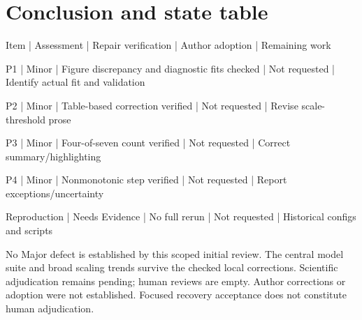 \documentclass[10pt]{article}
\begin{document}
\section*{Conclusion and state table}
Item | Assessment | Repair verification | Author adoption | Remaining work\par
P1 | Minor | Figure discrepancy and diagnostic fits checked | Not requested | Identify actual fit and validation\par
P2 | Minor | Table-based correction verified | Not requested | Revise scale-threshold prose\par
P3 | Minor | Four-of-seven count verified | Not requested | Correct summary/highlighting\par
P4 | Minor | Nonmonotonic step verified | Not requested | Report exceptions/uncertainty\par
Reproduction | Needs Evidence | No full rerun | Not requested | Historical configs and scripts\par
No Major defect is established by this scoped initial review. The central model suite and broad scaling trends survive the checked local corrections. Scientific adjudication remains pending; human reviews are empty. Author corrections or adoption were not established. Focused recovery acceptance does not constitute human adjudication.\par
\end{document}

